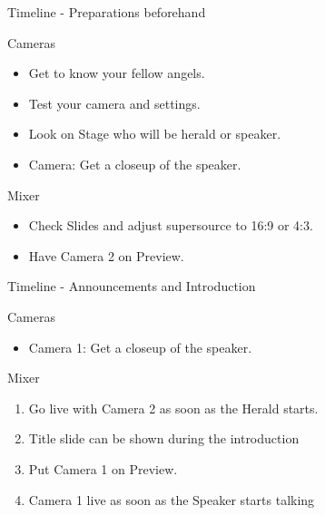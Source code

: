 \documentclass[aspectratio=169]{beamer}
\begin{document}
\begin{frame}{Timeline - Preparations beforehand}
	\begin{block}{Cameras}
		\begin{itemize}
			\item Get to know your fellow angels.
			\item Test your camera and settings.
			\item Look on Stage who will be herald or speaker.
			\item Camera: Get a closeup of the speaker.
		\end{itemize}
	\end{block}
	\begin{block}{Mixer}
		\begin{itemize}
			\item Check Slides and adjust supersource to 16:9 or 4:3.
			\item Have Camera 2 on Preview.
		\end{itemize}
	\end{block}
\end{frame}

\begin{frame}{Timeline - Announcements and Introduction}
	\begin{block}{Cameras}
		\begin{itemize}
			\item Camera 1: Get a closeup of the speaker.
		\end{itemize}
	\end{block}
	
	\begin{block}{Mixer}
		\begin{enumerate}
			\item Go live with Camera 2 as soon as the Herald starts.
			\item Title slide can be shown during the introduction 
			\item Put Camera 1 on Preview.
			\item Camera 1 live as soon as the Speaker starts talking
		\end{enumerate}
	\end{block}
\end{frame}
\end{document}
